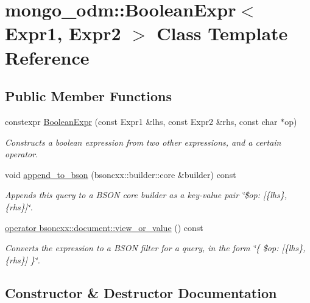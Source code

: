 \hypertarget{classmongo__odm_1_1BooleanExpr}{}\section{mongo\+\_\+odm\+:\+:Boolean\+Expr$<$ Expr1, Expr2 $>$ Class Template Reference}
\label{classmongo__odm_1_1BooleanExpr}
\subsection*{Public Member Functions}
\begin{DoxyCompactItemize}
\item 
constexpr \hyperlink{classmongo__odm_1_1BooleanExpr_a47afd7061d2494c8baf629667f0a7a25}{Boolean\+Expr} (const Expr1 \&lhs, const Expr2 \&rhs, const char $\ast$op)
\begin{DoxyCompactList}\small\item\em Constructs a boolean expression from two other expressions, and a certain operator. \end{DoxyCompactList}\item 
void \hyperlink{classmongo__odm_1_1BooleanExpr_a7e4a898b2a56dd7d07595c0f3195be94}{append\+\_\+to\+\_\+bson} (bsoncxx\+::builder\+::core \&builder) const 
\begin{DoxyCompactList}\small\item\em Appends this query to a B\+S\+ON core builder as a key-\/value pair \char`\"{}\$op\+: \mbox{[}\{lhs\}, \{rhs\}\mbox{]}\char`\"{}. \end{DoxyCompactList}\item 
\hyperlink{classmongo__odm_1_1BooleanExpr_a8c86b1be15ed3d9a22c81dc0bdb4e7a9}{operator bsoncxx\+::document\+::view\+\_\+or\+\_\+value} () const \hypertarget{classmongo__odm_1_1BooleanExpr_a8c86b1be15ed3d9a22c81dc0bdb4e7a9}{}\label{classmongo__odm_1_1BooleanExpr_a8c86b1be15ed3d9a22c81dc0bdb4e7a9}

\begin{DoxyCompactList}\small\item\em Converts the expression to a B\+S\+ON filter for a query, in the form \char`\"{}\{ \$op\+: \mbox{[}\{lhs\}, \{rhs\}\mbox{]} \}\char`\"{}. \end{DoxyCompactList}\end{DoxyCompactItemize}


\subsection{Constructor \& Destructor Documentation}
